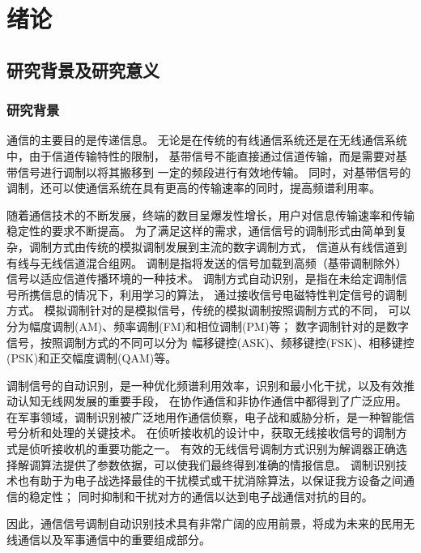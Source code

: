 \chapter{绪论}
\section{研究背景及研究意义}

\subsection{研究背景}
通信的主要目的是传递信息。 
无论是在传统的有线通信系统还是在无线通信系统中，由于信道传输特性的限制，
基带信号不能直接通过信道传输，而是需要对基带信号进行调制以将其搬移到 一定的频段进行有效地传输。
同时，对基带信号的调制，还可以使通信系统在具有更高的传输速率的同时，提高频谱利用率。\par

随着通信技术的不断发展，终端的数目呈爆发性增长，用户对信息传输速率和传输稳定性的要求不断提高。
为了满足这样的需求，通信信号的调制形式由简单到复杂，调制方式由传统的模拟调制发展到主流的数字调制方式，
信道从有线信道到有线与无线信道混合组网。
调制是指将发送的信号加载到高频（基带调制除外）信号以适应信道传播环境的一种技术。
调制方式自动识别，是指在未给定调制信号所携信息的情况下，利用学习的算法，
通过接收信号电磁特性判定信号的调制方式。
模拟调制针对的是模拟信号，传统的模拟调制按照调制方式的不同，
可以分为幅度调制(AM)、频率调制(FM)和相位调制(PM)等；
数字调制针对的是数字信号，按照调制方式的不同可以分为
幅移键控(ASK)、频移键控(FSK)、相移键控(PSK)和正交幅度调制(QAM)等。 \par

调制信号的自动识别，是一种优化频谱利用效率，识别和最小化干扰，以及有效推动认知无线网发展的重要手段，
在协作通信和非协作通信中都得到了广泛应用\cite{nandi1995automatic}。
在军事领域，调制识别被广泛地用作通信侦察，电子战和威胁分析，是一种智能信号分析和处理的关键技术\cite{程汉文2009基于累计量的干扰信号调制识别算法}\cite{张春磊2013认知电子战初探}。
在侦听接收机的设计中，获取无线接收信号的调制方式是侦听接收机的重要功能之一。
有效的无线信号调制方式识别为解调器正确选择解调算法提供了参数依据，可以使我们最终得到准确的情报信息。
调制识别技术也有助于为电子战选择最佳的干扰模式或干扰消除算法，以保证我方设备之间通信的稳定性；
同时抑制和干扰对方的通信以达到电子战通信对抗的目的。\par

因此，通信信号调制自动识别技术具有非常广阔的应用前景，将成为未来的民用无线通信以及军事通信中的重要组成部分。\par


